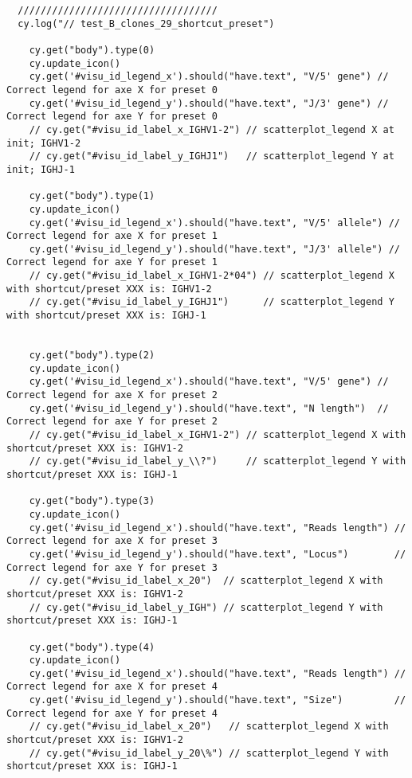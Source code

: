 \begin{verbatim}
  ///////////////////////////////////
  cy.log("// test_B_clones_29_shortcut_preset")

    cy.get("body").type(0)
    cy.update_icon()
    cy.get('#visu_id_legend_x').should("have.text", "V/5' gene") // Correct legend for axe X for preset 0
    cy.get('#visu_id_legend_y').should("have.text", "J/3' gene") // Correct legend for axe Y for preset 0
    // cy.get("#visu_id_label_x_IGHV1-2") // scatterplot_legend X at init; IGHV1-2
    // cy.get("#visu_id_label_y_IGHJ1")   // scatterplot_legend Y at init; IGHJ-1

    cy.get("body").type(1)
    cy.update_icon()
    cy.get('#visu_id_legend_x').should("have.text", "V/5' allele") // Correct legend for axe X for preset 1
    cy.get('#visu_id_legend_y').should("have.text", "J/3' allele") // Correct legend for axe Y for preset 1
    // cy.get("#visu_id_label_x_IGHV1-2*04") // scatterplot_legend X with shortcut/preset XXX is: IGHV1-2
    // cy.get("#visu_id_label_y_IGHJ1")      // scatterplot_legend Y with shortcut/preset XXX is: IGHJ-1


    cy.get("body").type(2)
    cy.update_icon()
    cy.get('#visu_id_legend_x').should("have.text", "V/5' gene") // Correct legend for axe X for preset 2
    cy.get('#visu_id_legend_y').should("have.text", "N length")  // Correct legend for axe Y for preset 2
    // cy.get("#visu_id_label_x_IGHV1-2") // scatterplot_legend X with shortcut/preset XXX is: IGHV1-2
    // cy.get("#visu_id_label_y_\\?")     // scatterplot_legend Y with shortcut/preset XXX is: IGHJ-1

    cy.get("body").type(3)
    cy.update_icon()
    cy.get('#visu_id_legend_x').should("have.text", "Reads length") // Correct legend for axe X for preset 3
    cy.get('#visu_id_legend_y').should("have.text", "Locus")        // Correct legend for axe Y for preset 3
    // cy.get("#visu_id_label_x_20")  // scatterplot_legend X with shortcut/preset XXX is: IGHV1-2
    // cy.get("#visu_id_label_y_IGH") // scatterplot_legend Y with shortcut/preset XXX is: IGHJ-1

    cy.get("body").type(4)
    cy.update_icon()
    cy.get('#visu_id_legend_x').should("have.text", "Reads length") // Correct legend for axe X for preset 4
    cy.get('#visu_id_legend_y').should("have.text", "Size")         // Correct legend for axe Y for preset 4
    // cy.get("#visu_id_label_x_20")   // scatterplot_legend X with shortcut/preset XXX is: IGHV1-2
    // cy.get("#visu_id_label_y_20\%") // scatterplot_legend Y with shortcut/preset XXX is: IGHJ-1


\end{verbatim}
